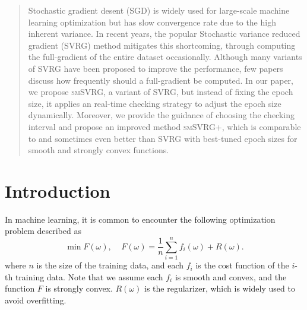 \documentclass[conference]{IEEEtran}
\begin{document}

\maketitle

\begin{abstract}
Stochastic gradient desent (SGD) is widely used for large-scale machine learning optimization but has slow convergence rate due to the high inherent variance. In recent years, the popular Stochastic variance reduced gradient (SVRG) method mitigates this shortcoming, through computing the full-gradient of the entire dataset occasionally. Although many variants of SVRG have been proposed to improve the performance, few papers discuss how frequently should a full-gradient be computed. In our paper, we propose \textsc{smSVRG}, a variant of SVRG, but instead of fixing the epoch size, it applies an real-time checking strategy to adjust the epoch size dynamically. Moreover, we provide the guidance of choosing the checking interval and propose an improved method \textsc{smSVRG+}, which is comparable to and sometimes even better than SVRG with best-tuned epoch sizes for smooth and strongly convex functions.

\end{abstract}


%
\IEEEpeerreviewmaketitle



\section{Introduction}
In machine learning, it is common to encounter the following optimization problem described as 
\begin{equation}
\label{equa_loss_minimization}
\min F(\omega),~~~~~F(\omega)=\frac{1}{n}\sum\limits_{i=1}^n f_i(\omega)+R(\omega).
\end{equation}
where $n$ is the size of the training data, and each $f_i$ is the cost function of the $i$-th training data. Note that we assume each $f_i$ is smooth and convex, and the function $F$ is strongly convex. $R(\omega)$ is the regularizer, which is widely used to avoid overfitting.
\end{document}
